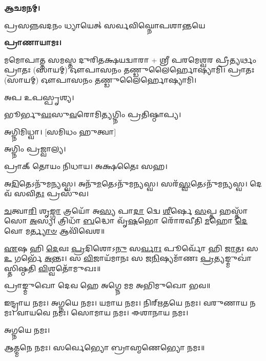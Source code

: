
\textbf{𑌆𑌚𑌮𑌨𑌮𑍍।}

{𑌪𑍍𑌰𑌸𑌨𑍍𑌨𑌵𑌦𑌨𑌂 𑌧𑍍𑌯𑌾𑌯𑍇𑌤𑍍 𑌸𑌰𑍍𑌵𑌵𑌿𑌘𑍍𑌨𑍋𑌪𑌶𑌾𑌨𑍍𑌤𑌯𑍇}
 
\textbf{𑌪𑍍𑌰𑌾𑌣𑌾𑌯𑌾𑌮𑌃।} 

𑌮𑌮𑍋𑌪𑌾𑌤𑍍𑌤 𑌸𑌮𑌸𑍍𑌤 𑌦𑍁𑌰𑌿𑌤𑌕𑍍𑌷𑌯𑌦𑍍𑌵𑌾𑌰𑌾 + 𑌶𑍍𑌰𑍀 𑌪𑌰𑌮𑍇𑌶𑍍𑌵𑌰 𑌪𑍍𑌰𑍀𑌤𑍍𑌯𑌰𑍍𑌥𑌂 𑌪𑍍𑌰𑌾𑌤𑌃 (𑌸𑌾𑌯𑌮𑍍) 𑌔𑌪𑌾𑌸𑌨𑌂 𑌤𑌣𑍍𑌡𑍁𑌲𑍈𑌰𑍍𑌹𑍋𑌷𑍍𑌯𑌾𑌮𑌿। 𑌪𑍍𑌰𑌾𑌤𑌃 (𑌸𑌾𑌯𑌮𑍍) 𑌔𑌪𑌾𑌸𑌨𑌂 𑌤𑌣𑍍𑌡𑍁𑌲𑍈𑌰𑍍𑌹𑍋𑌷𑍍𑌯𑌾𑌮𑌿।

𑌅𑌪 𑌉𑌪𑌸𑍍𑌪𑍃𑌶𑍍𑌯।


𑌭𑍂𑌰𑍍𑌭𑍁\-\ul{𑌵𑌃}\-𑌸𑍁\-\ul{𑌵}\-𑌰𑍋𑌮𑌿𑌤𑍍𑌯𑌗𑍍𑌨𑌿𑌂 𑌪𑍍𑌰𑌤𑌿𑌷𑍍𑌠𑌾𑌪𑍍𑌯।

𑌅𑌗𑍍𑌨𑌿𑌮𑌿𑌧𑍍𑌵𑌾। [𑌸𑌮𑌿𑌧𑌂 𑌹𑍁𑌤𑍍𑌵𑌾]

𑌅𑌗𑍍𑌨𑌿𑌂 𑌪𑍍𑌰𑌜𑍍𑌵𑌾𑌲𑍍𑌯।

𑌪𑍍𑌰𑌾𑌕𑍍 𑌤𑍋𑌯𑌂 𑌨𑌿𑌧𑌾𑌯। 𑌅𑌕𑍍𑌷𑌤𑍈𑌃 𑌸𑌹।

𑌅\-\ul{𑌦𑌿}\-𑌤𑍇𑌽𑌨𑍁᳴𑌮𑌨𑍍𑌯𑌸𑍍𑌵। 𑌅𑌨𑍁᳴\-\ul{𑌮}\-𑌤𑍇𑌽𑌨𑍁᳴𑌮𑌨𑍍𑌯𑌸𑍍𑌵। 𑌸𑌰᳴\-\ul{𑌸𑍍𑌵}\-𑌤𑍇𑌽𑌨𑍁᳴𑌮𑌨𑍍𑌯𑌸𑍍𑌵। 𑌦𑍇𑌵᳴ 𑌸𑌵𑌿\-\ul{𑌤𑌃} 𑌪𑍍𑌰𑌸𑍁᳴𑌵।


\-\ul{𑌚}\-𑌤𑍍𑌵𑌾\-\ul{𑌰𑌿} 𑌶𑍃\-\ul{𑌙𑍍𑌗𑌾} 𑌤𑍍𑌰𑌯𑍋᳴ 𑌅\-\ul{𑌸𑍍𑌯} 𑌪𑌾\-\ul{𑌦𑌾} 𑌦𑍍𑌵𑍇 \ul{𑌶𑍀}\-𑌰𑍍\mbox{}𑌷𑍇 \ul{𑌸}\-𑌪𑍍𑌤 𑌹𑌸𑍍𑌤𑌾᳴𑌸𑍋 \ul{𑌅}\-𑌸𑍍𑌯। 𑌤𑍍𑌰𑌿𑌧𑌾᳴ \ul{𑌬}\-𑌦𑍍𑌧𑍋 𑌵𑍃᳴\-\ul{𑌷}\-𑌭𑍋 𑌰𑍋᳴𑌰𑌵𑍀𑌤𑌿 \ul{𑌮}\-𑌹𑍋 \ul{𑌦𑍇}\-𑌵𑍋 𑌮\-\ul{𑌰𑍍𑌤𑍍𑌯𑌾}\-\-\ul{𑍞} 𑌆𑌵𑌿᳴𑌵𑍇𑌶॥

\-\ul{𑌏}\-𑌷 𑌹𑌿 \ul{𑌦𑍇}\-𑌵𑌃 \ul{𑌪𑍍𑌰}\-𑌦𑌿𑌶𑍋𑌽\-\ul{𑌨𑍁} 𑌸\-\ul{𑌰𑍍𑌵𑌾𑌃} 𑌪𑍂𑌰𑍍𑌵𑍋᳴ 𑌹𑌿 \ul{𑌜𑌾}\-𑌤𑌃 𑌸 \ul{𑌉} 𑌗𑌰𑍍𑌭𑍇᳴ \ul{𑌅}\-𑌨𑍍𑌤𑌃। 𑌸 \ul{𑌵𑌿}\-𑌜𑌾𑌯᳴𑌮𑌾𑌨𑌃 𑌸 𑌜\-\ul{𑌨𑌿}\-𑌷𑍍𑌯𑌮𑌾᳴𑌣𑌃 \ul{𑌪𑍍𑌰}\-𑌤𑍍𑌯𑌙𑍍𑌮𑍁𑌖𑌾॑𑌸𑍍𑌤𑌿𑌷𑍍𑌠𑌤𑌿 \ul{𑌵𑌿}\-𑌶𑍍𑌵𑌤𑍋᳴𑌮𑍁𑌖𑌃॥ 

𑌪𑍍𑌰𑌾𑌙𑍍𑌮𑍁𑌖𑍋 𑌦𑍇𑌵 𑌹𑍇 𑌅𑌗𑍍𑌨𑍇 𑌮𑌮 𑌅𑌭𑌿𑌮𑍁𑌖𑍋 𑌭𑌵॥

𑌇𑌨𑍍𑌦𑍍𑌰𑌾𑌯 𑌨𑌮𑌃। 𑌅𑌗𑍍𑌨𑌯𑍇 𑌨𑌮𑌃। 𑌯𑌮𑌾𑌯 𑌨𑌮𑌃। 𑌨𑌿𑌰𑍍‌𑌋𑌤𑌯𑍇 𑌨𑌮𑌃। 
𑌵𑌰𑍁𑌣𑌾𑌯 𑌨𑌮𑌃। 𑌵𑌾𑌯𑌵𑍇 𑌨𑌮𑌃। 𑌸𑍋𑌮𑌾𑌯 𑌨𑌮𑌃। 𑌈𑌶𑌾𑌨𑌾𑌯 𑌨𑌮𑌃। 

𑌅𑌗𑍍𑌨𑌯𑍇 𑌨𑌮𑌃। 






𑌆𑌤𑍍𑌮𑌨𑍇 𑌨𑌮𑌃। 𑌸𑌰𑍍𑌵𑍇𑌭𑍍𑌯𑍋 𑌬𑍍𑌰𑌾𑌹𑍍𑌮𑌣𑍇𑌭𑍍𑌯𑍋 𑌨𑌮𑌃॥



